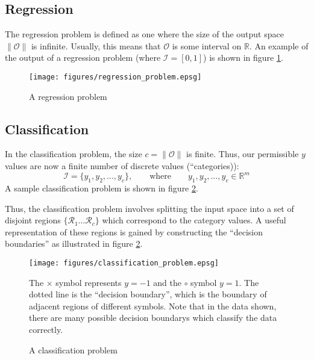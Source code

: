 \subsection{Regression}
\label{sec:regression}

The regression problem is defined as one where the size of the output
space $\|\mathcal{O}\|$ is infinite.  Usually, this means that
$\mathcal{O}$ is some interval on $\mathbb{R}$.  An example of the
output of a regression problem (where $\mathcal{I} = [0,1]$) is shown
in figure \ref{fig:regression problem}.

\begin{figure}
\begin{center}
\texttt{[image: figures/regression\_problem.epsg]}
\end{center}
\caption{A regression problem}
\label{fig:regression problem}
\end{figure}



\subsection{Classification}
\label{sec:classification}

In the classification problem, the size $c = \| \mathcal{O} \|$ is
finite.  Thus, our permissible
$y$ values are now a finite number of discrete values (``categories)):
%
\begin{equation}
\mathcal{I} = \{y_1, y_2, \ldots, y_c\}, \qquad \mbox{where} \qquad y_1, y_2,
\ldots, y_c \in \mathbb{R}^m
\end{equation}
%
A sample classification problem is shown in
figure \ref{fig:classification problem}.

Thus, the classification problem involves splitting the input space
into a set of disjoint regions $\{ \mathcal{R}_1 \ldots \mathcal{R}_c
\}$ which correspond to the category values.  A useful representation
of these regions is gained by constructing the ``decision boundaries''
as illustrated in figure \ref{fig:classification problem}.

\begin{figure}
\begin{center}
\texttt{[image: figures/classification\_problem.epsg]}
\end{center}
\caption{A classification problem}
\label{fig:classification problem}
The $\times$ symbol represents $y=-1$ and the $\circ$ symbol $y=1$.
The dotted line is the ``decision boundary'', which is the boundary of
adjacent regions of different symbols.  Note that in the data shown,
there are many possible decision boundarys which classify the data correctly.
\end{figure}

